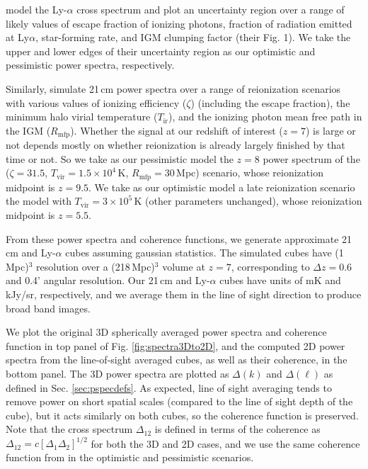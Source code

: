 \documentclass{emulateapj}
\begin{document}
\citet{Gong2014} model the Ly-$\alpha$ cross spectrum and plot an uncertainty region over a range of likely values of escape fraction of ionizing photons, fraction of radiation emitted at Ly$\alpha$, star-forming rate, and IGM clumping factor (their Fig. 1). We take the upper and lower edges of their uncertainty region as our optimistic and pessimistic power spectra, respectively. 

Similarly, \citet{PoberNextGen} simulate 21\,cm power spectra over a range of reionization scenarios with various values of ionizing efficiency ($\zeta$) (including the escape fraction), the minimum halo virial temperature ($T_\text{ir}$), and the ionizing photon mean free path in the IGM ($R_\text{mfp}$). Whether the signal at our redshift of interest ($z=7$) is large or not depends mostly on whether reionization is already largely finished by that time or not. So we take as our pessimistic model the $z=8$ power spectrum of the ($\zeta =31.5$, $T_\text{vir}=1.5\times10^4$\,K, $R_\text{mfp}=30$\,Mpc) scenario, whose reionization midpoint is $z=9.5$. We take as our optimistic model a late reionization scenario the model with $T_\text{vir}=3\times10^5$\,K (other parameters unchanged), whose reionization midpoint is $z=5.5$. 

From these power spectra and coherence functions, we generate approximate 21\,cm and Ly-$\alpha$ cubes assuming gaussian statistics. The simulated cubes have (1\,Mpc)$^3$ resolution over a (218\,Mpc)$^3$ volume at $z=7$, corresponding to $\Delta z=0.6$ and 0.4' angular resolution. Our 21\,cm and Ly-$\alpha$ cubes have units of mK and kJy/sr, respectively, and we average them in the line of sight direction to produce broad band images.

We plot the original 3D spherically averaged power spectra and coherence function in top panel of Fig. \ref{fig:spectra3Dto2D}, and the computed 2D power spectra from the line-of-sight averaged cubes, as well as their coherence, in the bottom panel. The 3D power spectra are plotted as $\Delta(k)$ and $\Delta(\ell)$ as defined in Sec. \ref{sec:pspecdefs}. As expected, line of sight averaging tends to remove power on short spatial scales (compared to the line of sight depth of the cube), but it acts similarly on both cubes, so the coherence function is preserved. Note that the cross spectrum $\Delta_{12}$ is defined in terms of the coherence as $\Delta_{12}=c[\Delta_1\Delta_2]^{1/2}$ for both the 3D and 2D cases, and we use the same coherence function from \citet{Heneka2016} in the optimistic and pessimistic scenarios.
\end{document}
